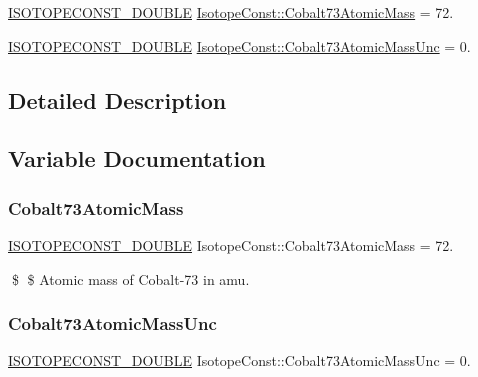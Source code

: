 \begin{DoxyCompactItemize}
\item 
\mbox{\hyperlink{group___isotope_const-_macros_ga8f45a7272ce02c0b4c65c44636ed719a}{I\+S\+O\+T\+O\+P\+E\+C\+O\+N\+S\+T\+\_\+\+D\+O\+U\+B\+LE}} \mbox{\hyperlink{group___isotope_const-_cobalt-_co73_ga8e2098384c5aedb95dc10025f51e3008}{Isotope\+Const\+::\+Cobalt73\+Atomic\+Mass}} = 72.
\item 
\mbox{\hyperlink{group___isotope_const-_macros_ga8f45a7272ce02c0b4c65c44636ed719a}{I\+S\+O\+T\+O\+P\+E\+C\+O\+N\+S\+T\+\_\+\+D\+O\+U\+B\+LE}} \mbox{\hyperlink{group___isotope_const-_cobalt-_co73_ga40bd580cc7541561e9bf80504c07d568}{Isotope\+Const\+::\+Cobalt73\+Atomic\+Mass\+Unc}} = 0.
\end{DoxyCompactItemize}


\subsection{Detailed Description}


\subsection{Variable Documentation}
\mbox{\label{group___isotope_const-_cobalt-_co73_ga8e2098384c5aedb95dc10025f51e3008}} 
\subsubsection{\texorpdfstring{Cobalt73\+Atomic\+Mass}{Cobalt73AtomicMass}}
{\footnotesize\ttfamily \mbox{\hyperlink{group___isotope_const-_macros_ga8f45a7272ce02c0b4c65c44636ed719a}{I\+S\+O\+T\+O\+P\+E\+C\+O\+N\+S\+T\+\_\+\+D\+O\+U\+B\+LE}} Isotope\+Const\+::\+Cobalt73\+Atomic\+Mass = 72.}

\$ \$ Atomic mass of Cobalt-\/73 in amu. \mbox{\label{group___isotope_const-_cobalt-_co73_ga40bd580cc7541561e9bf80504c07d568}} 
\subsubsection{\texorpdfstring{Cobalt73\+Atomic\+Mass\+Unc}{Cobalt73AtomicMassUnc}}
{\footnotesize\ttfamily \mbox{\hyperlink{group___isotope_const-_macros_ga8f45a7272ce02c0b4c65c44636ed719a}{I\+S\+O\+T\+O\+P\+E\+C\+O\+N\+S\+T\+\_\+\+D\+O\+U\+B\+LE}} Isotope\+Const\+::\+Cobalt73\+Atomic\+Mass\+Unc = 0.}

